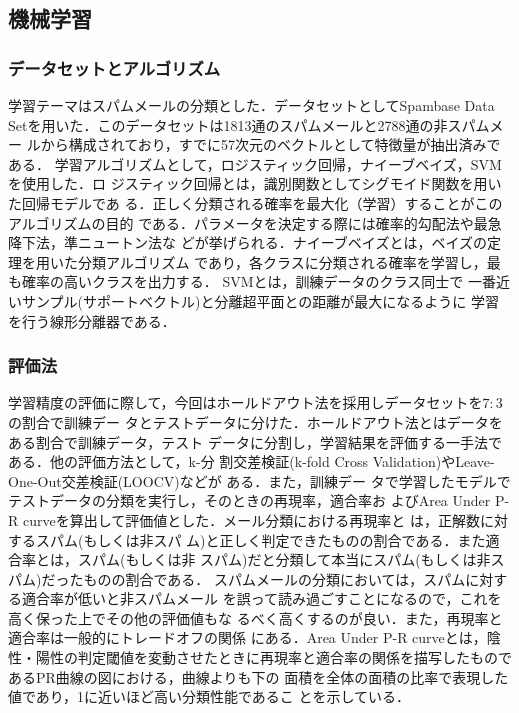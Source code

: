 \documentclass[a4paper,12pt]{jarticle}
\begin{document}
\subsection{機械学習}

\subsubsection{データセットとアルゴリズム}
学習テーマはスパムメールの分類とした．データセットとしてSpambase Data
Setを用いた．このデータセットは1813通のスパムメールと2788通の非スパムメー
ルから構成されており，すでに57次元のベクトルとして特徴量が抽出済みである．
学習アルゴリズムとして，ロジスティック回帰，ナイーブベイズ，SVMを使用した．ロ
ジスティック回帰とは，識別関数としてシグモイド関数を用いた回帰モデルであ
る．正しく分類される確率を最大化（学習）することがこのアルゴリズムの目的
である．パラメータを決定する際には確率的勾配法や最急降下法，準ニュートン法な
どが挙げられる．ナイーブベイズとは，ベイズの定理を用いた分類アルゴリズム
であり，各クラスに分類される確率を学習し，最も確率の高いクラスを出力する．
SVMとは，訓練データのクラス同士で
一番近いサンプル(サポートベクトル)と分離超平面との距離が最大になるように
学習を行う線形分離器である．

\subsubsection{評価法}
学習精度の評価に際して，今回はホールドアウト法を採用しデータセットを$7:3$の割合で訓練デー
タとテストデータに分けた．ホールドアウト法とはデータをある割合で訓練データ，テスト
データに分割し，学習結果を評価する一手法である．他の評価方法として，k-分
割交差検証(k-fold Cross Validation)やLeave-One-Out交差検証(LOOCV)などが
ある．また，訓練デー
タで学習したモデルでテストデータの分類を実行し，そのときの再現率，適合率お
よびArea Under P-R curveを算出して評価値とした．メール分類における再現率と
は，正解数に対するスパム(もしくは非スパ
ム)と正しく判定できたものの割合である．また適合率とは，スパム(もしくは非
スパム)だと分類して本当にスパム(もしくは非スパム)だったものの割合である．
スパムメールの分類においては，スパムに対する適合率が低いと非スパムメール
を誤って読み過ごすことになるので，これを高く保った上でその他の評価値もな
るべく高くするのが良い．また，再現率と適合率は一般的にトレードオフの関係
にある．Area Under P-R curveとは，陰性・陽性の判定閾値を変動させたときに再現率と適合率の関係を描写したものであるPR曲線の図における，曲線よりも下の
面積を全体の面積の比率で表現した値であり，1に近いほど高い分類性能であるこ
とを示している．
\end{document}
